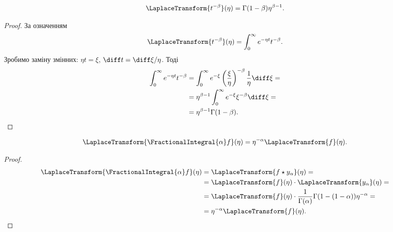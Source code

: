 \begin{lemma}
    \begin{equation}
        \LaplaceTransform{t^{-\beta}}(\eta) = \Gamma(1 - \beta) \eta^{\beta - 1}.
    \end{equation}
\end{lemma}
\begin{proof}
    За означенням
    \begin{equation}
        \LaplaceTransform{t^{-\beta}}(\eta) = \int_0^\infty e^{-\eta t} t^{-\beta}.
    \end{equation}
    Зробимо заміну змінних: $\eta t = \xi$, $\diff t = \diff \xi / \eta$. Тоді
    \begin{equation}
        \begin{aligned}
            \int_0^\infty e^{-\eta t} t^{-\beta} &= \int_0^\infty e^{-\xi} \left(\frac{\xi}{\eta}\right)^{-\beta} \frac{1}{\eta} \diff \xi = \\
            &= \eta^{\beta - 1} \int_0^\infty e^{-\xi} \xi^{-\beta} \diff \xi = \\
            &= \eta^{\beta - 1} \Gamma(1 - \beta).
        \end{aligned}
    \end{equation}
\end{proof}

\begin{lemma}
    \begin{equation}
        \LaplaceTransform{\FractionalIntegral{\alpha} f}(\eta) = \eta^{-\alpha} \LaplaceTransform{f}(\eta).
    \end{equation}
\end{lemma}
\begin{proof}
    \begin{equation}
        \begin{aligned}
            \LaplaceTransform{\FractionalIntegral{\alpha} f}(\eta) &= \LaplaceTransform{f \star y_\alpha}(\eta) = \\
            &= \LaplaceTransform{f}(\eta) \cdot \LaplaceTransform{y_\alpha}(\eta) = \\
            &= \LaplaceTransform{f}(\eta) \cdot \frac{1}{\Gamma(\alpha)} \Gamma(1 - (1 - \alpha)) \eta^{-\alpha} = \\
            &= \eta^{-\alpha} \LaplaceTransform{f}(\eta).
        \end{aligned}
    \end{equation}
\end{proof}

